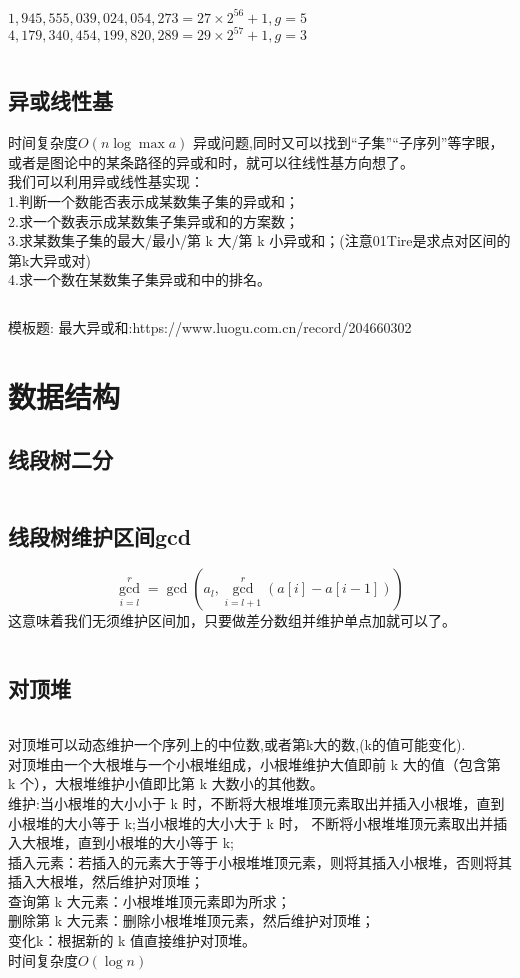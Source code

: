 \documentclass[titlepage, a4paper]{report}
\newcommand{\cppcode}[1]{  
    \inputminted[mathescape]{cpp}{source/#1}  
}
\begin{document}
$1,945,555,039,024,054,273=27\times 2^{56}+1,g=5$\\

$4,179,340,454,199,820,289=29\times 2^{57}+1,g=3$

\cppcode{Ploy.cpp}



\section{异或线性基}
时间复杂度$O(n\log{\max{a}})$
异或问题,同时又可以找到“子集”“子序列”等字眼，或者是图论中的某条路径的异或和时，就可以往线性基方向想了。\\
我们可以利用异或线性基实现：\\
1.判断一个数能否表示成某数集子集的异或和；\\
2.求一个数表示成某数集子集异或和的方案数；\\
3.求某数集子集的最大/最小/第 k 大/第 k 小异或和；(注意01Tire是求点对区间的第k大异或对) \\
4.求一个数在某数集子集异或和中的排名。\\
\cppcode{basis.cpp}
模板题:
最大异或和:https://www.luogu.com.cn/record/204660302


\chapter{数据结构}
\section{线段树二分}
\cppcode{segment_tree.cpp}
\section{线段树维护区间gcd}
$$
\gcd_{i=l}^{r}=\gcd(a_l,\gcd_{i=l+1}^{r}(a[i]-a[i-1]))
$$
这意味着我们无须维护区间加，只要做差分数组并维护单点加就可以了。\\
\cppcode{segtgcd.cpp}

\section{对顶堆}
\cppcode{Maxheap.cpp}
对顶堆可以动态维护一个序列上的中位数,或者第k大的数,(k的值可能变化).\\
对顶堆由一个大根堆与一个小根堆组成，小根堆维护大值即前 k 大的值（包含第 k 个），大根堆维护小值即比第 k 大数小的其他数。\\
维护:当小根堆的大小小于 k 时，不断将大根堆堆顶元素取出并插入小根堆，直到小根堆的大小等于 k;当小根堆的大小大于 k 时，
不断将小根堆堆顶元素取出并插入大根堆，直到小根堆的大小等于 k;\\
插入元素：若插入的元素大于等于小根堆堆顶元素，则将其插入小根堆，否则将其插入大根堆，然后维护对顶堆；\\
查询第 k 大元素：小根堆堆顶元素即为所求；\\
删除第 k 大元素：删除小根堆堆顶元素，然后维护对顶堆；\\
变化k：根据新的 k 值直接维护对顶堆。\\
时间复杂度$O(\log{n})$
\cppcode{对顶堆.cpp}
\end{document}
